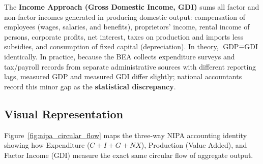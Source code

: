 \documentclass[11pt,letterpaper]{article}
\begin{document}
The \textbf{Income Approach (Gross Domestic Income, GDI)} sums all factor and non-factor incomes generated in producing domestic output: compensation of employees (wages, salaries, and benefits), proprietors' income, rental income of persons, corporate profits, net interest, taxes on production and imports less subsidies, and consumption of fixed capital (depreciation). In theory, $\text{GDP} \equiv \text{GDI}$ identically. In practice, because the BEA collects expenditure surveys and tax/payroll records from separate administrative sources with different reporting lags, measured GDP and measured GDI differ slightly; national accountants record this minor gap as the \textbf{statistical discrepancy}.

\subsection*{Visual Representation}
Figure~\ref{fig:nipa_circular_flow} maps the three-way NIPA accounting identity showing how Expenditure ($C + I + G + NX$), Production (Value Added), and Factor Income (GDI) measure the exact same circular flow of aggregate output.
\end{document}
